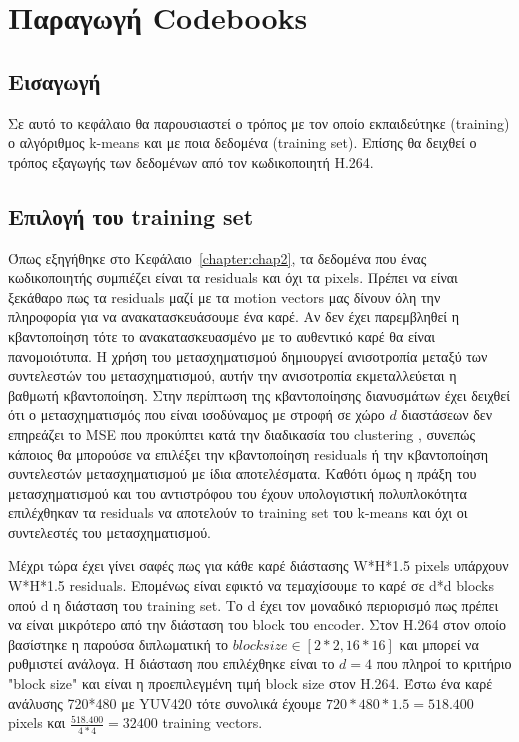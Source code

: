 ﻿\chapter{Παραγωγή Codebooks}
\label{chapter:chap4}

\section{Εισαγωγή}
\label{section:sect41}

\indent Σε αυτό το κεφάλαιο θα παρουσιαστεί ο τρόπος με τον οποίο εκπαιδεύτηκε (training) ο αλγόριθμος k-means  και με ποια δεδομένα (training set). Επίσης θα δειχθεί ο τρόπος εξαγωγής των δεδομένων από τον κωδικοποιητή H.264.

\section{Επιλογή του training set}
\label{section:sect42}

\indent Όπως εξηγήθηκε στο Κεφάλαιο~\ref{chapter:chap2}, τα δεδομένα που ένας κωδικοποιητής συμπιέζει είναι τα residuals και όχι τα pixels. Πρέπει να είναι ξεκάθαρο πως τα residuals μαζί με τα motion vectors μας δίνουν όλη την πληροφορία για να ανακατασκευάσουμε ένα καρέ. Αν δεν έχει παρεμβληθεί η κβαντοποίηση τότε το ανακατασκευασμένο με το αυθεντικό καρέ θα είναι πανομοιότυπα. Η χρήση του μετασχηματισμού δημιουργεί ανισοτροπία μεταξύ των συντελεστών του μετασχηματισμού, αυτήν την ανισοτροπία εκμεταλλεύεται η βαθμωτή κβαντοποίηση. Στην περίπτωση της κβαντοποίησης διανυσμάτων έχει δειχθεί ότι ο μετασχηματισμός που είναι ισοδύναμος με στροφή σε χώρο $d$ διαστάσεων δεν επηρεάζει το MSE που προκύπτει κατά την διαδικασία του clustering \cite{gersho}, συνεπώς κάποιος θα μπορούσε να επιλέξει την κβαντοποίηση residuals ή την κβαντοποίηση συντελεστών μετασχηματισμού με ίδια αποτελέσματα. Καθότι όμως η πράξη του μετασχηματισμού και του αντιστρόφου του έχουν υπολογιστική πολυπλοκότητα επιλέχθηκαν τα residuals να αποτελούν το training set του k-means και όχι οι συντελεστές του μετασχηματισμού.

\indent Μέχρι τώρα έχει γίνει σαφές πως για κάθε καρέ διάστασης W*H*1.5 pixels υπάρχουν W*H*1.5 residuals. Επομένως είναι εφικτό να τεμαχίσουμε το καρέ σε d*d blocks οπού d η διάσταση του training set. Το d έχει τον μοναδικό περιορισμό πως πρέπει να είναι μικρότερο από την διάσταση του block του encoder. Στον H.264 στον οποίο βασίστηκε η παρούσα διπλωματική το $blocksize\in[2*2,16*16]$ και μπορεί να ρυθμιστεί ανάλογα. Η διάσταση που επιλέχθηκε είναι το $d=4$ που πληροί το κριτήριο "block size" και είναι η προεπιλεγμένη τιμή block size στον H.264. Έστω ένα καρέ ανάλυσης 720*480 με YUV420 τότε συνολικά έχουμε $720*480*1.5=518.400$ pixels και $ \frac{518.400}{4*4} = 32400 $ training vectors.


